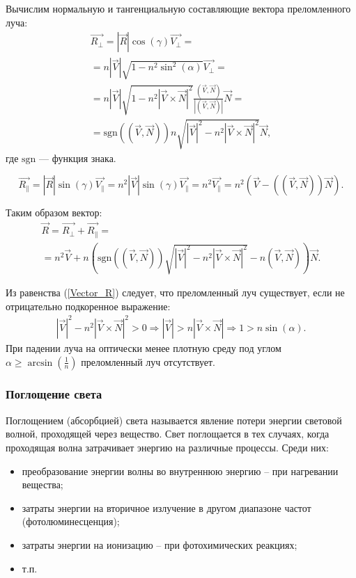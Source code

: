 \documentclass[14pt,a4paper]{extarticle}
\begin{document}
			Вычислим нормальную и тангенциальную составляющие вектора преломленного луча:			
			\begin{gather*}
				\vec{R_{\perp}} = |\vec{R}|\cos(\gamma)\vec{V_{\perp}} = \\ = n|\vec{V}|\sqrt{1-n^2\sin^2(\alpha)}\vec{V_{\perp}} =  \\
				=  n|\vec{V}|\sqrt{1-n^2|\vec{V}\times\vec{N}|^2}\frac{(\vec{V},\vec{N})}{|(\vec{V},\vec{N})|}\vec{N} =  \\ =  \mathrm{sgn}((\vec{V},\vec{N}))n\sqrt{|\vec{V}|^2-n^2|\vec{V}\times\vec{N}|^2}\vec{N},
			\end{gather*}			
			где $\mathrm{sgn}$ --- функция знака.
			
			\begin{equation*}
			\vec{R_{\parallel}} = |\vec{R}|\sin(\gamma)\vec{V_{\parallel}} = n^2|\vec{V}|\sin(\gamma)\vec{V_{\parallel}} = n^2\vec{V_{\parallel}} = n^2(\vec{V}-((\vec{V},\vec{N}))\vec{N}).
			\end{equation*}
			
			Таким образом вектор:
			\begin{eqnarray}
			\label{Vector_R}
			& \vec{R} = \vec{R_{\perp}}+\vec{R_{\parallel}} = & \nonumber\\ & = n^2\vec{V}+n(\mathrm{sgn}((\vec{V},\vec{N}))\sqrt{|\vec{V}|^2-n^2|\vec{V}\times\vec{N}|^2} - n(\vec{V},\vec{N}))\vec{N}.&
			\end{eqnarray}
			
			Из равенства (\ref{Vector_R}) следует, что преломленный луч существует, если не отрицательно подкоренное выражение:
			\begin{eqnarray}
			\label{sqrt}
			|\vec{V}|^2-n^2|\vec{V}\times\vec{N}|^2 > 0 \Rightarrow |\vec{V}|>n|\vec{V}\times\vec{N}| \Rightarrow 1 > n\sin(\alpha).
			\end{eqnarray}
			При падении луча на оптически менее плотную среду под углом  $\alpha \geqslant \arcsin(\frac{1}{n})$ преломленный луч отсутствует.
		
		\subsubsection*{Поглощение света}
			Поглощением (абсорбцией) света называется явление потери энергии световой волной, проходящей через вещество.
			Свет поглощается в тех случаях, когда проходящая волна затрачивает энергию на различные процессы. 
			Среди них:
			\begin{itemize}
				\item преобразование энергии волны во внутреннюю энергию – при нагревании вещества;
				\item затраты энергии на вторичное излучение в другом диапазоне частот (фотолюминесценция);
				\item затраты энергии на ионизацию – при фотохимических реакциях;
				\item т.п.
			\end{itemize}
			
\end{document}
